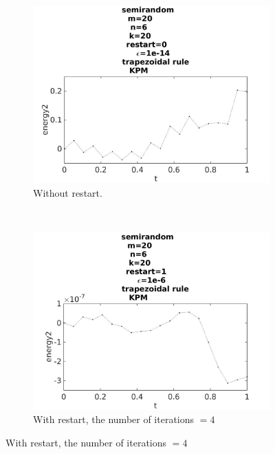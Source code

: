 \begin{figure}[H]
        \centering
        \begin{subfigure}[b]{0.3\textwidth}
                \includegraphics[width=\textwidth]{../MATLAB/fig/energyarnrestart0.jpg}
                \caption{  Without restart. }
                \label{fig:energyarnrestart0}
        \end{subfigure}%
        ~
        \begin{subfigure}[b]{0.3\textwidth}
                \includegraphics[width=\textwidth]{../MATLAB/fig/energyarnrestart2.jpg}
                \caption{ With restart, the number of iterations $ = 4$ }
                \label{fig:energyarnrestart2}
        \end{subfigure}

\end{figure}
